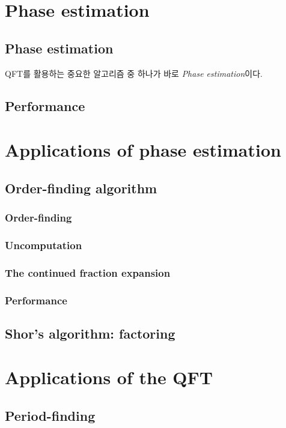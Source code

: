 \section{Phase estimation}
\subsection{Phase estimation}
QFT를 활용하는 중요한 알고리즘 중 하나가 바로 \textit{Phase estimation}이다. 
\subsection{Performance}

\section{Applications of phase estimation}
\subsection{Order-finding algorithm}
\subsubsection{Order-finding}
\subsubsection{Uncomputation}
\subsubsection{The continued fraction expansion}
\subsubsection{Performance}

\subsection{Shor’s algorithm: factoring}


\section{Applications of the QFT}
\subsection{Period-finding}
